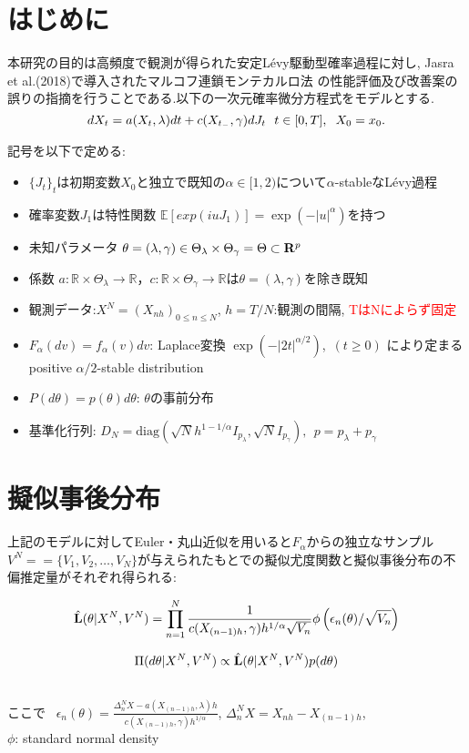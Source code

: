 \documentclass[portrait,a0]{a0poster}
\begin{document}
\Large{
\section{はじめに}
本研究の目的は高頻度で観測が得られた安定L{\'e}vy駆動型確率過程に対し,
Jasra et al.(2018)で導入されたマルコフ連鎖モンテカルロ法
の性能評価及び改善案の誤りの指摘を行うことである.以下の一次元確率微分方程式をモデルとする.
\begin{equation*}
dX_{t} = a(X_{t},\lambda)dt + c(X_{t_{-}}, \gamma)dJ_{t} ~~t\in [0,T] ,\hspace{2mm}X_0 = x_0.
\end{equation*}

記号を以下で定める:
\begin{itemize}
\item $\{J_{t}\}_{t}$は初期変数$X_{0}$と独立で既知の$\alpha \in [1,2)$について$\alpha$-stableなL{\'e}vy過程
\item 確率変数$J_1$は特性関数 $\mathbb{E}[exp(iuJ_{1})] = \exp({-{|u|}^{\alpha}})$を持つ
\item 未知パラメータ $\theta = (\lambda,\gamma) \in {\Theta}_{\lambda} \times {\Theta}_{\gamma} = \Theta \subset {\bf{R}}^{p}$
\item 係数 $a:\mathbb{R} \times \Theta_{\lambda} \rightarrow \mathbb{R}$，$c:\mathbb{R} \times \Theta_{\gamma} \rightarrow \mathbb{R}$は$\theta = (\lambda,\gamma)$を除き既知
\item 観測データ:$X^{N} = (X_{nh})_{0 \le n \le N}$, $h = T/N$:観測の間隔, \textcolor{red}{TはNによらず固定}
\item $F_\alpha(dv) = f_\alpha(v)dv$: Laplace変換 $\exp (-|2t|^{{\alpha}/2})$,\ $(t \ge 0)$ により定まる positive $\alpha/2$-stable distribution
\item $P(d\theta) = p(\theta)d\theta$: $\theta$の事前分布
\item 基準化行列: $D_{N} = \mathrm{diag}(\sqrt{N}h^{1-1/\alpha}I_{p_{\lambda}},\sqrt{N}I_{p_{\gamma}}), \ \  p = p_\lambda + p_\gamma$
\end{itemize}
}
\Large{
\section{擬似事後分布}
上記のモデルに対してEuler・丸山近似を用いると$F_\alpha$からの独立なサンプル$V^N = =\{V_1,V_2,\ldots,V_{N}\}$が与えられたもとでの擬似尤度関数と擬似事後分布の不偏推定量がそれぞれ得られる:
}
\Large{
$$
\Hat{\bf{L}}(\theta|X^{N},V^{N}) = \prod_{n=1}^{N}\frac{1}{c(X_{(n-1)h},\gamma)h^{1/\alpha}\sqrt{V_{n}}}{\phi}
\left(\epsilon_n(\theta)/\sqrt{V_n}\right)
$$


$$
\Pi(d\theta|X^N,V^N) \propto 
\Hat{\bf{L}}(\theta|X^{N},V^{N})p(d\theta)
$$
}\\
\noindent
\Large{
ここで \ $\epsilon_n(\theta) = \frac{\Delta^{N}_{n}X - a(X_{(n-1)h},\lambda)h }{c(X_{(n-1)h}, \gamma)h^{1/\alpha}}$, 
$\Delta^{N}_{n}X = X_{nh} - X_{(n-1)h}$, \\$\phi$: standard normal density 
}
\end{document}

